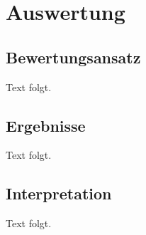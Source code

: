 \chapter{Auswertung}

\section{Bewertungsansatz}
Text folgt.

\section{Ergebnisse}
Text folgt.

\section{Interpretation}
Text folgt.

